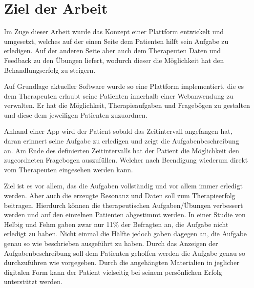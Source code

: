 \section{Ziel der Arbeit}

Im Zuge dieser Arbeit wurde das Konzept einer Plattform entwickelt und umgesetzt, welches auf der einen Seite dem Patienten hilft sein Aufgabe zu erledigen. Auf der anderen Seite aber auch dem Therapeuten Daten und Feedback zu den Übungen liefert, wodurch dieser die Möglichkeit hat den Behandlungserfolg zu steigern.

Auf Grundlage aktueller Software wurde so eine Plattform implementiert, die es dem Therapeuten erlaubt seine Patienten innerhalb einer Webanwendung zu verwalten. Er hat die Möglichkeit, Therapieaufgaben und Fragebögen zu gestalten und diese dem jeweiligen Patienten zuzuordnen.

Anhand einer App wird der Patient sobald das Zeitintervall angefangen hat, daran erinnert seine Aufgabe zu erledigen und zeigt die Aufgabenbeschreibung an. Am Ende des definierten Zeitintervalls hat der Patient die Möglichkeit den zugeordneten Fragebogen auszufüllen. Welcher nach Beendigung wiederum direkt vom Therapeuten eingesehen werden kann.

Ziel ist es vor allem, das die Aufgaben vollständig und vor allem immer erledigt werden. Aber auch die erzeugte Resonanz und Daten soll zum Therapieerfolg beitragen. Hierdurch können die therapeutischen Aufgaben/Übungen verbessert werden und auf den einzelnen Patienten abgestimmt werden.
In einer Studie von Helbig und Fehm \cite{HF05} gaben zwar nur 11\% der Befragten an, die Aufgabe nicht erledigt zu haben. Nicht einmal die Hälfte jedoch gaben dagegen an, die Aufgabe genau so wie beschrieben ausgeführt zu haben. Durch das Anzeigen der Aufgabenbeschreibung soll dem Patienten geholfen werden die Aufgabe genau so durchzuführen wie vorgegeben. Durch die angehängten Materialien in jeglicher digitalen Form kann der Patient vielseitig bei seinem persönlichen Erfolg unterstützt werden.

